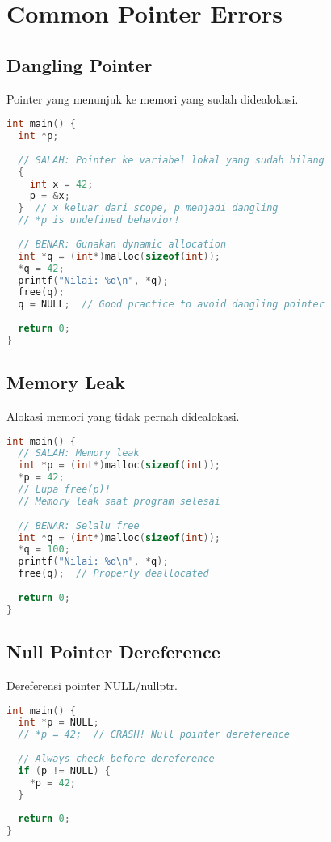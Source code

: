 \documentclass[../main.tex]{subfiles}
\begin{document}
\section{Common Pointer Errors}

\subsection{Dangling Pointer}

Pointer yang menunjuk ke memori yang sudah didealokasi.

\begin{lstlisting}[language=C, caption={Dangling pointer problem}]
int main() {
  int *p;
  
  // SALAH: Pointer ke variabel lokal yang sudah hilang
  {
    int x = 42;
    p = &x;
  }  // x keluar dari scope, p menjadi dangling
  // *p is undefined behavior!
  
  // BENAR: Gunakan dynamic allocation
  int *q = (int*)malloc(sizeof(int));
  *q = 42;
  printf("Nilai: %d\n", *q);
  free(q);
  q = NULL;  // Good practice to avoid dangling pointer
  
  return 0;
}
\end{lstlisting}

\subsection{Memory Leak}

Alokasi memori yang tidak pernah didealokasi.

\begin{lstlisting}[language=C, caption={Memory leak}]
int main() {
  // SALAH: Memory leak
  int *p = (int*)malloc(sizeof(int));
  *p = 42;
  // Lupa free(p)!
  // Memory leak saat program selesai
  
  // BENAR: Selalu free
  int *q = (int*)malloc(sizeof(int));
  *q = 100;
  printf("Nilai: %d\n", *q);
  free(q);  // Properly deallocated
  
  return 0;
}
\end{lstlisting}

\subsection{Null Pointer Dereference}

Dereferensi pointer NULL/nullptr.

\begin{lstlisting}[language=C, caption={Null pointer dereference}]
int main() {
  int *p = NULL;
  // *p = 42;  // CRASH! Null pointer dereference
  
  // Always check before dereference
  if (p != NULL) {
    *p = 42;
  }
  
  return 0;
}
\end{lstlisting}
\end{document}
